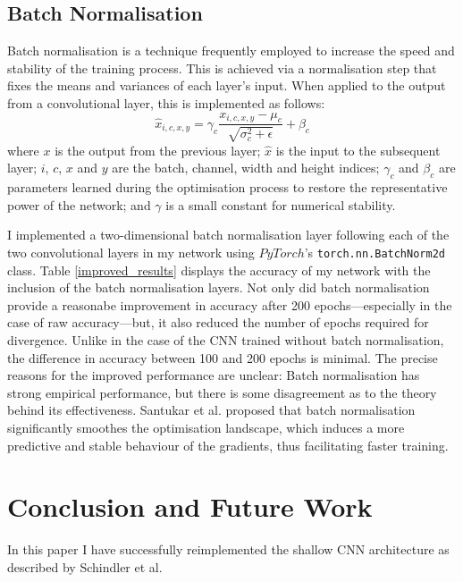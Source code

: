 \documentclass[conference]{IEEEtran}
\begin{document}
\subsection{Batch Normalisation}

Batch normalisation \cite{IoffeSzegedy} is a technique frequently employed to increase the speed and stability of the training process.
This is achieved via a normalisation step that fixes the means and variances of each layer's input.
When applied to the output from a convolutional layer, this is implemented as follows:
\[
\hat{x}_{i,c,x,y}=\gamma_c\frac{x_{i,c,x,y}-\mu_c}{\sqrt{\sigma_c^2+\epsilon}}+\beta_c
\]
where $x$ is the output from the previous layer; $\hat{x}$ is the input to the subsequent layer; $i$, $c$, $x$ and $y$ are the batch, channel, width and height indices; $\gamma_c$ and $\beta_c$ are parameters learned during the optimisation process to restore the representative power of the network; and $\gamma$ is a small constant for numerical stability.

I implemented a two-dimensional batch normalisation layer following each of the two convolutional layers in my network using $PyTorch$'s \texttt{torch.nn.BatchNorm2d} class.
Table \ref{improved_results} displays the accuracy of my network with the inclusion of the batch normalisation layers.
Not only did batch normalisation provide a reasonabe improvement in accuracy after 200 epochs---especially in the case of raw accuracy---but, it also reduced the number of epochs required for divergence.
Unlike in the case of the CNN trained without batch normalisation, the difference in accuracy between 100 and 200 epochs is minimal.
The precise reasons for the improved performance are unclear: Batch normalisation has strong empirical performance, but there is some disagreement as to the theory behind its effectiveness.
Santukar et al. \cite{SanturkarEtAl} proposed that batch normalisation significantly smoothes the optimisation landscape, which induces a more predictive and stable behaviour of the gradients, thus facilitating faster training.

\section{Conclusion and Future Work}

In this paper I have successfully reimplemented the shallow CNN architecture as described by Schindler et al.




\end{document}
